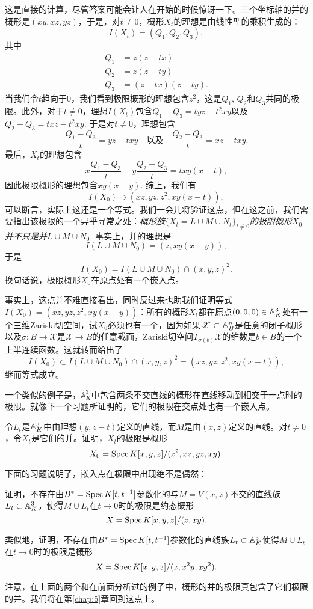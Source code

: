 这是直接的计算，尽管答案可能会让人在开始的时候惊讶一下。三个坐标轴的并的概形是$(xy,xz,yz)$，于是，对$t\neq 0$，概形$X_t$的理想是由线性型的乘积生成的：
\[
	I(X_t)=(Q_1,Q_2,Q_3),
\]
其中
\[
	\begin{aligned}
		Q_1&=z(z-tx)\\
		Q_2&=z(z-ty)\\
		Q_3&=(z-tx)(z-ty).
	\end{aligned}
\]
当我们令$t$趋向于$0$，我们看到极限概形的理想包含$z^2$，这是$Q_1$, $Q_2$和$Q_3$共同的极限。此外，对于$t\neq 0$，理想$I(X_t)$包含$Q_1-Q_3=tyz-t^2xy$以及$Q_2-Q_3=txz-t^2xy$. 于是对$t\neq 0$，理想包含
\[
	\frac{Q_1-Q_3}{t}=yz-txy\quad\text{以及}\quad \frac{Q_2-Q_3}{t}=xz-txy.
\]
最后，$X_t$的理想包含
\[
	x\frac{Q_1-Q_3}{t}-y\frac{Q_2-Q_3}{t}=txy(x-t),
\]
因此极限概形的理想包含$xy(x-y)$. 综上，我们有
\[
	I(X_0)\supset (xz,yz,z^2,xy(x-t)),
\]
可以断言，实际上这还是一个等式。我们一会儿将验证这点，但在这之前，我们需要指出该极限的一个异乎寻常之处：\textit{概形族$\{X_t=L\cup M\cup N_t\}_{t\neq 0}$的极限概形$X_0$并不只是并$L\cup M\cup N_0$.} 事实上，并的理想是
\[
	I(L\cup M\cup N_0)=(z,xy(x-y)),
\]
于是
\[
	I(X_0)=I(L\cup M\cup N_0)\cap (x,y,z)^2.
\]
换句话说，极限概形$X_0$在原点处有一个嵌入点。

事实上，这点并不难直接看出，同时反过来也助我们证明等式$I(X_0)=(xz,yz,z^2,xy(x-y))$：所有的概形$X_t$都在原点$(0,0,0)\in\mathbb{A}_K^3$处有一个三维Zariski切空间，试$X_0$必须也有一个，因为如果$\mathscr{X}\subset \mathbb{A}_B^n$是任意的闭子概形以及$\sigma:B\to\mathscr{X}$是$\mathscr{X}\to B$的任意截面，Zariski切空间$T_{\sigma(b)}\mathscr{X}$的维数是$b\in B$的一个上半连续函数。这就转而给出了
\[
	I(X_0)\subset I(L\cup M\cup N_0)\cap (x,y,z)^2=(xz,yz,z^2,xy(x-t)),
\]
继而等式成立。

一个类似的例子是，$\mathbb{A}_K^3$中包含两条不交直线的概形在直线移动到相交于一点时的极限。就像下一个习题所证明的，它们的极限在交点处也有一个嵌入点。

\begin{exe}
令$L_t$是$\mathbb{A}_K^3$中由理想$(y,z-t)$定义的直线，而$M$是由$(x,z)$定义的直线。对$t\neq 0$，令$X_t$是它们的并。证明，$X_t$的极限是概形
\[
	X_0=\operatorname{Spec} K[x,y,z]/(z^2,xz,yz,xy).
\]

\end{exe}

下面的习题说明了，嵌入点在极限中出现绝不是偶然：

\begin{exe}
\begin{compactenum}[(a)]
\item 证明，不存在由$B^*=\operatorname{Spec} K[t,t^{-1}]$参数化的与$M=V(x,z)$不交的直线族$L_t\subset \mathbb{A}_K^3$，使得$M\cup L_t$在$t\to 0$时的极限是约态概形
\[
	X=\operatorname{Spec} K[x,y,z]/(z,xy).
\]

\item 类似地，证明，不存在由$B^*=\operatorname{Spec} K[t,t^{-1}]$参数化的直线族$L_t\subset \mathbb{A}_K^3$使得$M\cup L_t$在$t\to 0$时的极限是概形
\[
	X=\operatorname{Spec} K[x,y,z]/(z,x^2y,xy^2).
\]
\end{compactenum}

注意，在上面的两个和在前面分析过的例子中，概形的并的极限真包含了它们极限的并。我们将在第\ref{chap:5}章回到这点上。
\end{exe}

